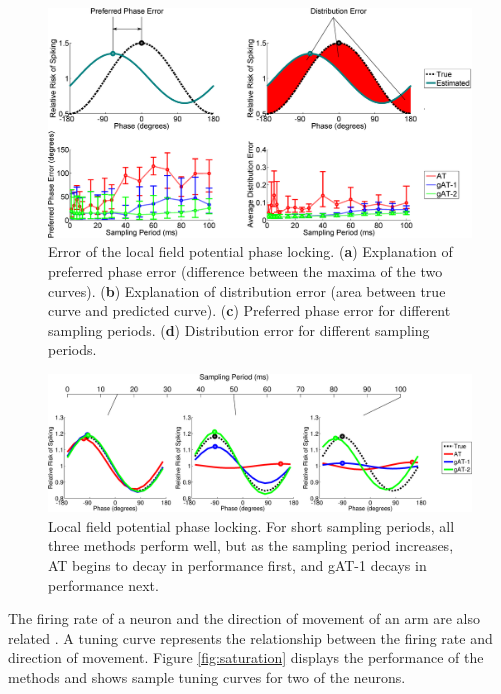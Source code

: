 \documentclass[10 pt]{article}
\begin{document}
\begin{figure}[htbp]
\begin{center}
\includegraphics[scale=0.30]{LFP_error.eps}
\caption{Error of the local field potential phase locking. (\textbf{a}) Explanation of preferred phase error (difference between the maxima of the two curves). (\textbf{b}) Explanation of distribution error (area between true curve and predicted curve). (\textbf{c}) Preferred phase error for different sampling periods. (\textbf{d}) Distribution error for different sampling periods.}
\label{fig:LFP_error}
\end{center}
\end{figure}

\begin{figure}[htbp]
\begin{center}
\includegraphics[scale=0.30]{LFP.eps}
\caption{Local field potential phase locking. For short sampling periods, all three methods perform well, but as the sampling period increases, AT begins to decay in performance first, and gAT-1 decays in performance next.}
\label{fig:LFP}
\end{center}
\end{figure}

The firing rate of a neuron and the direction of movement of an arm are also related \cite{???}.
A tuning curve represents the relationship between the firing rate and direction of movement.
Figure \ref{fig:saturation} displays the performance of the methods and shows sample tuning curves for two of the neurons.
\end{document}
